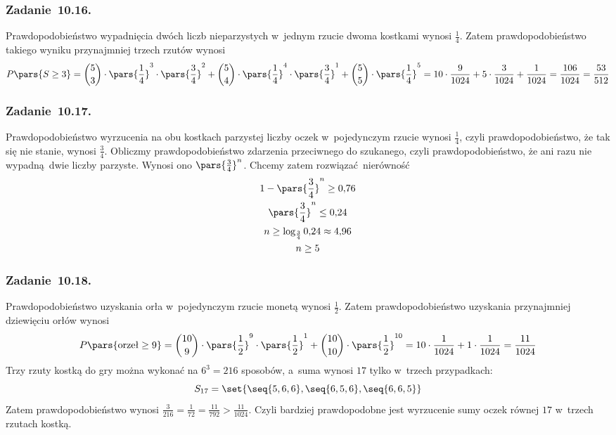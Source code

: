 \subsubsection*{Zadanie~10.16.}
Prawdopodobieństwo wypadnięcia dwóch liczb nieparzystych w~jednym rzucie dwoma kostkami wynosi \(\frac{1}{4}\). Zatem prawdopodobieństwo takiego wyniku przynajmniej trzech rzutów wynosi
\begin{equation*}
    P\pars{S \geq 3}
        = \binom{5}{3} \cdot \pars{\frac{1}{4}}^3 \cdot \pars{\frac{3}{4}}^2 + \binom{5}{4} \cdot \pars{\frac{1}{4}}^4 \cdot \pars{\frac{3}{4}}^1 + \binom{5}{5} \cdot \pars{\frac{1}{4}}^5
        = 10 \cdot \frac{9}{1024} + 5 \cdot \frac{3}{1024} +  \frac{1}{1024}
        = \frac{106}{1024}
        = \frac{53}{512}
\end{equation*}
\subsubsection*{Zadanie~10.17.}
Prawdopodobieństwo wyrzucenia na obu kostkach parzystej liczby oczek w~pojedynczym rzucie wynosi \(\frac{1}{4}\), czyli prawdopodobieństwo, że tak się nie stanie, wynosi \(\frac{3}{4}\). Obliczmy prawdopodobieństwo zdarzenia przeciwnego do szukanego, czyli prawdopodobieństwo, że ani razu nie wypadną dwie liczby parzyste. Wynosi ono \(\pars{\frac{3}{4}}^n\). Chcemy zatem rozwiązać nierówność
\begin{gather*}
    1 - \pars{\frac{3}{4}}^n \geq 0{,}76\\
    \pars{\frac{3}{4}}^n \leq 0{,}24\\
    n \geq \log_{\frac{3}{4}}0{,}24 \approx 4{,}96\\
    n \geq 5
\end{gather*}
\subsubsection*{Zadanie~10.18.}
Prawdopodobieństwo uzyskania orła w~pojedynczym rzucie monetą wynosi \(\frac{1}{2}\). Zatem prawdopodobieństwo uzyskania przynajmniej dziewięciu orłów wynosi
\begin{equation*}
    P\pars{\text{orzeł} \geq 9}
        = \binom{10}{9} \cdot \pars{\frac{1}{2}}^9 \cdot \pars{\frac{1}{2}}^1 + \binom{10}{10} \cdot \pars{\frac{1}{2}}^{10}
        = 10 \cdot \frac{1}{1024} + 1 \cdot \frac{1}{1024}
        = \frac{11}{1024}
\end{equation*}
Trzy rzuty kostką do gry można wykonać na \(6^3 = 216\) sposobów, a~suma wynosi \(17\) tylko w~trzech przypadkach:
\begin{equation*}
    S_{17} = \set{\seq{5, 6, 6}, \seq{6, 5, 6}, \seq{6, 6, 5}}
\end{equation*}
Zatem prawdopodobieństwo wynosi \(\frac{3}{216} = \frac{1}{72} = \frac{11}{792} > \frac{11}{1024}\). Czyli bardziej prawdopodobne jest wyrzucenie sumy oczek równej \(17\) w~trzech rzutach kostką.
